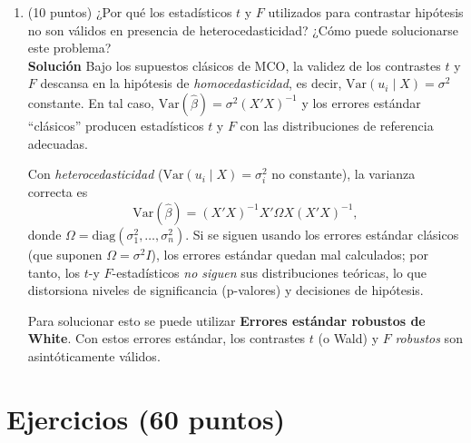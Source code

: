 \documentclass[10pt,a4paper]{article}
\begin{document}
\begin{enumerate}
\textbf{(b) Efecto de incluir una variable instrumental.}
Si existe endogeneidad (\(\mathrm{Cov}(X,u)\neq0\)), el estimador MCO es sesgado e inconsistente. Al usar VI/MC2E se identifica el efecto causal utilizando solo la parte \emph{exógena} de \(X\) inducida por \(Z\), obteniendo un estimador \(\hat\beta_{IV}\) consistente. 
En modelos simples, \(\hat\beta_{IV} = \dfrac{\mathrm{Cov}(Y,Z)}{\mathrm{Cov}(X,Z)}\). 
Comparativamente, cuando la omisión de habilidad provoca que MCO sobreestime el retorno a la educación, suele observarse \(\hat\beta_{MCO}>\hat\beta_{IV}\); si el problema fuera error de medición en \(X\), entonces \(\hat\beta_{MCO}<\hat\beta_{IV}\). 
Eso sí, la varianza de \(\hat\beta_{IV}\) tiende a ser mayor que la de MCO y aumenta si el instrumento es débil (bajo \(R^2\) en la primera etapa). 

\item (10 puntos) ¿Por qué los estadísticos \(t\) y \(F\) utilizados para contrastar hipótesis no son válidos en presencia de heterocedasticidad?
¿Cómo puede solucionarse este problema?
\\
\textbf{Solución}
Bajo los supuestos clásicos de MCO, la validez de los contrastes \(t\) y \(F\) descansa en la hipótesis de
\emph{homocedasticidad}, es decir, \(\mathrm{Var}(u_i \mid X)=\sigma^2\) constante. En tal caso,
\(\mathrm{Var}(\hat\beta)=\sigma^2 (X'X)^{-1}\) y los errores estándar ``clásicos'' producen
estadísticos \(t\) y \(F\) con las distribuciones de referencia adecuadas.

Con \emph{heterocedasticidad} (\(\mathrm{Var}(u_i \mid X)=\sigma_i^2\) no constante),
la varianza correcta es
\[
\mathrm{Var}(\hat\beta)=(X'X)^{-1} X' \Omega X (X'X)^{-1},
\]
donde \(\Omega=\mathrm{diag}(\sigma_1^2,\dots,\sigma_n^2)\).
Si se siguen usando los errores estándar clásicos (que suponen \(\Omega=\sigma^2 I\)),
los errores estándar quedan mal calculados; por tanto, los \(t\)-y \(F\)-estadísticos
\emph{no siguen} sus distribuciones teóricas, lo que distorsiona niveles de significancia
(p-valores) y decisiones de hipótesis.

\medskip
   Para solucionar esto se puede utilizar \textbf{Errores estándar robustos de White}.
  Con estos errores estándar, los contrastes \(t\) (o Wald) y \(F\) \emph{robustos}
  son asintóticamente válidos.
\end{enumerate}



\section{Ejercicios (60 puntos)}
\end{document}
